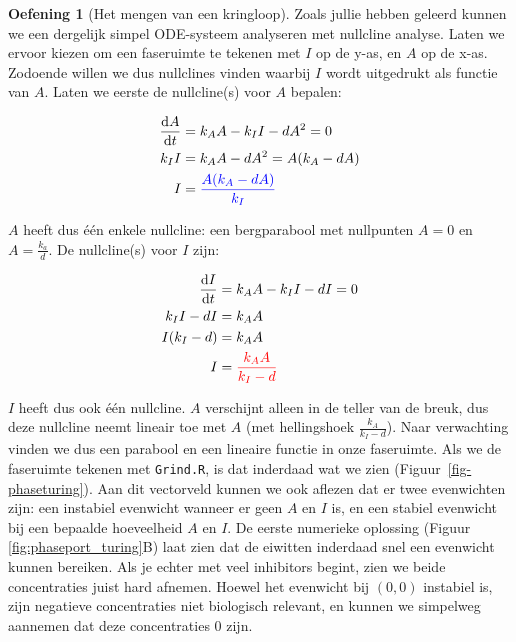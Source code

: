 \documentclass[
  a4paper,
]{scrbook}
\theoremstyle{definition}
\newtheorem{exercise}{Oefening}[chapter]
\theoremstyle{remark}
\begin{document}
\begin{exercise}[Het mengen van een
kringloop]
Zoals jullie hebben geleerd kunnen we een dergelijk simpel ODE-systeem
analyseren met nullcline analyse. Laten we ervoor kiezen om een
faseruimte te tekenen met \(I\) op de y-as, en \(A\) op de x-as.
Zodoende willen we dus nullclines vinden waarbij \(I\) wordt uitgedrukt
als functie van \(A\). Laten we eerste de nullcline(s) voor \(A\)
bepalen:

\begin{align*}
    \mathchoice{\frac{\mathrm{d}A}
{\mathrm{d}t}}{\mathrm{d}A/\mathrm{d}t}
{\mathrm{d}A/\mathrm{d}t}
{\mathrm{d}A/\mathrm{d}t} &= k_AA - k_II - dA^2 = 0 \\
    k_II &= k_AA - dA^2 = A(k_A-dA) \\
    I &= \color{blue} \frac{A(k_A-dA)}{k_I} \\
\end{align*}

\(A\) heeft dus één enkele nullcline: een bergparabool met nullpunten
\(A=0\) en \(A=\frac{k_a}{d}\). De nullcline(s) voor \(I\) zijn:

\begin{align}
    \mathchoice{\frac{\mathrm{d}I}
{\mathrm{d}t}}{\mathrm{d}I/\mathrm{d}t}
{\mathrm{d}I/\mathrm{d}t}
{\mathrm{d}I/\mathrm{d}t} &= k_AA - k_II - dI = 0 \\
    k_II - dI &= k_AA \\
    I(k_I - d) &= k_AA \\
    I &= \color{red} \frac{k_AA}{k_I - d} \\ 
\end{align}

\(I\) heeft dus ook één nullcline. \(A\) verschijnt alleen in de teller
van de breuk, dus deze nullcline neemt lineair toe met \(A\) (met
hellingshoek \(\frac{k_A}{k_I - d}\)). Naar verwachting vinden we dus
een parabool en een lineaire functie in onze faseruimte. Als we de
faseruimte tekenen met \texttt{Grind.R}, is dat inderdaad wat we zien
(Figuur~\ref{fig-phaseturing}). Aan dit vectorveld kunnen we ook aflezen
dat er twee evenwichten zijn: een instabiel evenwicht wanneer er geen
\(A\) en \(I\) is, en een stabiel evenwicht bij een bepaalde hoeveelheid
\(A\) en \(I\). De eerste numerieke oplossing (Figuur
\ref{fig:phaseport_turing}B) laat zien dat de eiwitten inderdaad snel
een evenwicht kunnen bereiken. Als je echter met veel inhibitors begint,
zien we beide concentraties juist hard afnemen. Hoewel het evenwicht bij
\((0,0)\) instabiel is, zijn negatieve concentraties niet biologisch
relevant, en kunnen we simpelweg aannemen dat deze concentraties \(0\)
zijn.


\end{exercise}
\end{document}
